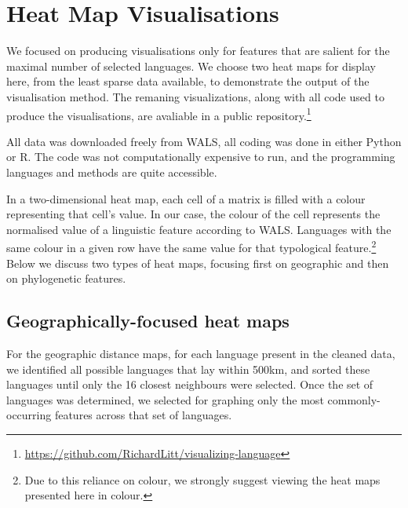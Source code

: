 \documentclass[11pt]{article}
\begin{document}
\section{Heat Map Visualisations}

We focused on producing visualisations only for features that are salient for the maximal number of selected languages. We choose two heat maps for display here, from the least sparse data available, to demonstrate the output of the visualisation method. The remaning visualizations, along with all code used to produce the visualisations, are avaliable in a public repository.\footnote{\url{https://github.com/RichardLitt/visualizing-language}}

All data was downloaded freely from WALS, all coding was done in either Python or R. The code was not computationally expensive to run, and the programming languages and methods are quite accessible. 

In a two-dimensional heat map, each cell of a matrix is filled with a colour representing that cell's value. In our case, the colour of the cell represents the normalised value of a linguistic feature according to WALS. Languages with the same colour in a given row have the same value for that typological feature.\footnote{Due to this reliance on colour, we strongly suggest viewing the heat maps presented here in colour.} Below we discuss two types of heat maps, focusing first on geographic and then on phylogenetic features.

\subsection{Geographically-focused heat maps}
For the geographic distance maps, for each language present in the cleaned data, we identified all possible languages that lay within 500km, and sorted these languages until only the 16 closest neighbours were selected. Once the set of languages was determined, we selected for graphing only the most commonly-occurring features across that set of languages.
\end{document}
